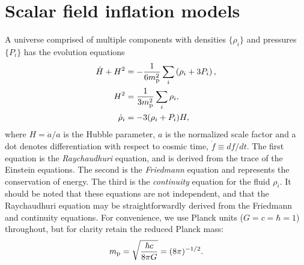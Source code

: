 \section{Scalar field inflation models}
\label{sec:Scalar_field_inflation_models}
%
A universe comprised of multiple components  with densities
$\{\rho_i\}$ and pressures $\{P_i\}$ has the evolution equations
%
\begin{align}
  \dot{H}+H^2 &= 
  -\frac{1}{6m_{\mathrm{p}}^2}\sum\limits_i\left( \rho_i + 3P_i\right), 
  \label{eqn:Raychaudhuri_rho}
  \\
  H^2 &= 
  \frac{1}{3m_{\mathrm{p}}^2}\sum\limits_i \rho_i, 
  \\
  \dot{\rho}_i 
  &= -3(\rho_i + P_i)H,  
  \label{eqn:conservation}
\end{align}
%
where $H=\dot{a}/a$ is the Hubble parameter, $a$ is the normalized scale factor and a dot denotes differentiation with respect to cosmic time, $\dot{f}\equiv df/dt$. The first equation is the {\em Raychaudhuri}\/ equation, and is derived from the trace of the Einstein equations. The second is the {\em Friedmann}\/ equation and represents the conservation of energy. The third is the {\em continuity}\/ equation for the fluid $\rho_i$. It should be noted that these equations are not independent, and that the Raychaudhuri equation may be straightforwardly derived from the Friedmann and continuity equations.  For convenience, we use Planck units ($G=c=\hbar=1$) throughout, but for clarity retain the reduced Planck mass: 
%
\[m_{\mathrm{p}} = \sqrt{\frac{\hbar c}{8\pi G}} = (8\pi)^{-1/2}.\]  
%


